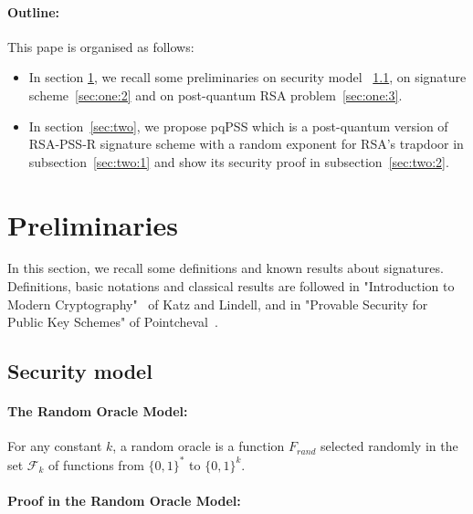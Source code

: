 \documentclass[a4paper,11pt]{article}
\begin{document}
\paragraph{Outline:} This pape is organised as follows:
\begin{itemize}
\item In section \ref{sect:2}, we recall some preliminaries on security model ~\ref{sec:one:1}, on signature scheme~\ref{sec:one:2} and on post-quantum RSA problem~\ref{sec:one:3}.
\item In section~\ref{sec:two}, we propose pqPSS which is a post-quantum version of RSA-PSS-R signature scheme with a random exponent for RSA's trapdoor in subsection~\ref{sec:two:1} and show its security proof in subsection~\ref{sec:two:2}.
\end{itemize}


\section{Preliminaries}\label{sect:2}
In this section, we recall some definitions and known results about signatures.
Definitions, basic notations and classical results are followed in "Introduction to Modern Cryptography"~\cite{Katz}
of Katz and Lindell, and  in "Provable Security for Public Key Schemes" of Pointcheval~\cite{Pointcheval}.

\subsection{Security model}\label{sec:one:1}

\paragraph{The Random Oracle Model:}

For any constant $k$, a random oracle is a function $F_{rand}$ selected randomly in the set $\mathcal{F}_{k}$ of functions from $\{0,1\}^{*}$ to $\{0,1\}^{k}$.

\vspace{0.2cm}

\paragraph{Proof in the Random Oracle Model:}
\end{document}
